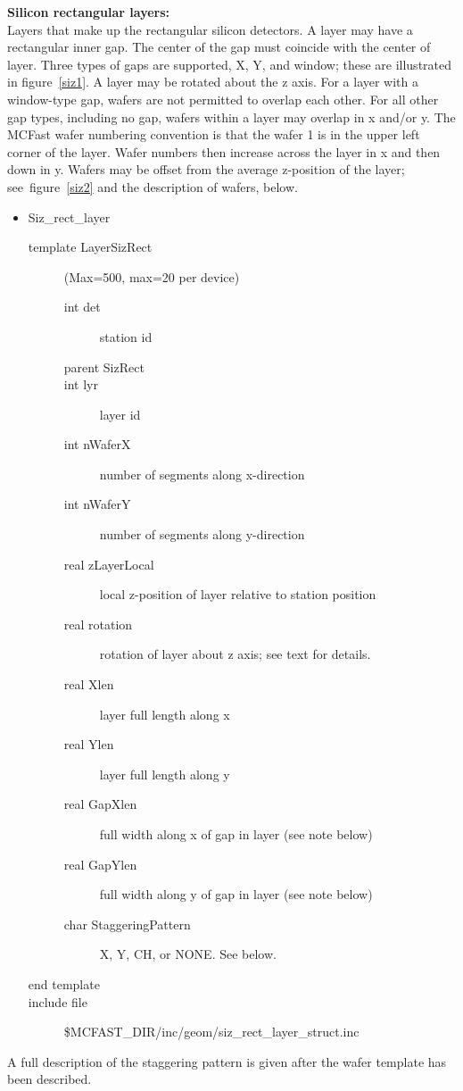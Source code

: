 {\bf Silicon rectangular layers:} \\
Layers that make up the rectangular silicon detectors.  A layer may have
a rectangular inner gap. The center of the gap must coincide with
the center of layer.
Three types of gaps are supported, X, Y, and window; these
are illustrated in figure~\ref{siz1}.
A layer may be rotated about the z axis. 
For a layer with a window-type gap, wafers are not permitted to
overlap each other.  For all other gap types, including no gap,
wafers within a layer may overlap in x and/or y.
The MCFast wafer numbering convention is that the wafer 1 is in the
upper left corner of the layer.  Wafer numbers then increase across the 
layer in x and then down in y.  Wafers may be offset from the average
z-position of the layer; see~figure~\ref{siz2} and the
description of wafers, below.

\filbreak

\begin{itemize}
\item Siz\_rect\_layer
\begin{description}
\item[{\rm template} LayerSizRect] (Max=500, max=20 per device) 
\begin{description}
\item[{\rm int} det] station id 
\item[{\rm parent} SizRect] 
\item[{\rm int} lyr] layer id 
\item[{\rm int} nWaferX] number of segments along x-direction  
\item[{\rm int} nWaferY] number of segments along y-direction  
\item[{\rm real} zLayerLocal] local z-position of layer relative 
to station position 
\item[{\rm real} rotation] rotation of layer about z axis;
                           see text for details.
\item[{\rm real} Xlen] layer full length along x  
\item[{\rm real} Ylen] layer full length along y  
\item[{\rm real} GapXlen] full width along x of gap in layer (see note below)  
\item[{\rm real} GapYlen] full width along y of gap in layer (see note below) 
\item[{\rm char} StaggeringPattern] X, Y, CH, or NONE. See below.
\end{description}
\item[end template] 
\item[include file] \$MCFAST\_DIR/inc/geom/siz\_rect\_layer\_struct.inc
\end{description}
\end{itemize}
%
A full description of the staggering pattern is given after the
wafer template has been described.

